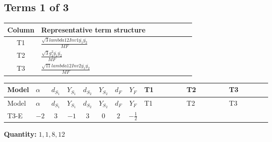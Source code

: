 \documentclass[8pt]{article}
\begin{document}
\begin{landscape}
\subsection*{Terms 1 of 3}
\begin{center}
\begin{tabular}{@{}c >{\raggedright\arraybackslash}p{0.82\linewidth}@{}}
\toprule
Column & Representative term structure \\
\midrule
T1 & \(\displaystyle \frac{\sqrt{3} lambda12Inv1 \overline{y_{1}} \overline{y_{2}}}{MF}\) \\
\midrule
T2 & \(\displaystyle \frac{\sqrt{3} g_{1}^{2} \overline{y_{1}} \overline{y_{2}}}{MF}\) \\
\midrule
T3 & \(\displaystyle \frac{\sqrt{11} lambda12Inv2 \overline{y_{1}} \overline{y_{2}}}{MF}\) \\
\midrule
\bottomrule
\end{tabular}
\end{center}
\smallskip
\tiny
\begin{longtable}{@{}llcccccc >{\raggedright\arraybackslash}p{0.21\linewidth} >{\raggedright\arraybackslash}p{0.21\linewidth} >{\raggedright\arraybackslash}p{0.21\linewidth}@{}}
\toprule
Model & $\alpha$ & $d_{S_1}$ & $Y_{S_1}$ & $d_{S_2}$ & $Y_{S_2}$ & $d_F$ & $Y_F$ & T1 & T2 & T3 \\
\midrule
\endfirsthead
\toprule
Model & $\alpha$ & $d_{S_1}$ & $Y_{S_1}$ & $d_{S_2}$ & $Y_{S_2}$ & $d_F$ & $Y_F$ & T1 & T2 & T3 \\
\midrule
\endhead
T3-E & $-2$ & $3$ & $-1$ & $3$ & $0$ & $2$ & $-\frac{1}{2}$ & \scriptsize\adjustbox{max width=\linewidth}{$\begin{gathered} - \frac{\sqrt{3} lambda12Inv1 \overline{y_{1}} \overline{y_{2}}}{6 MF}\end{gathered}$} & \scriptsize\adjustbox{max width=\linewidth}{$\begin{gathered} \frac{\sqrt{3} g_{1}^{2} \overline{y_{1}} \overline{y_{2}}}{8 MF}\end{gathered}$} & \scriptsize\adjustbox{max width=\linewidth}{$\begin{gathered} \frac{3 \sqrt{11} lambda12Inv2 \overline{y_{1}} \overline{y_{2}}}{22 MF}\end{gathered}$} \\
\midrule
\bottomrule
\end{longtable}
\clearpage
\noindent\textbf{Quantity: }$\mathrm{1,1,8,12}$\par\smallskip

\end{landscape}
\end{document}
